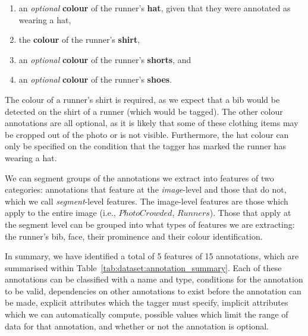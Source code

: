 \begin{enumerate}
  \item an \textit{optional} \textbf{colour} of the runner's \textbf{hat}, given that they were annotated as wearing a hat,
  \item the \textbf{colour} of the runner's \textbf{shirt},
  \item an \textit{optional} \textbf{colour} of the runner's \textbf{shorts}, and
  \item an \textit{optional} \textbf{colour} of the runner's \textbf{shoes}.
\end{enumerate}


The colour of a runner's shirt is required, as we expect that a bib would be detected on the shirt of a runner (which would be tagged). The other colour annotations are all optional, as it is likely that some of these clothing items may be cropped out of the photo or is not visible. Furthermore, the hat colour can only be specified on the condition that the tagger has marked the runner has wearing a hat.

We can segment groups of the annotations we extract into features of two categories: annotations that feature at the \textit{image}-level and those that do not, which we call \textit{segment}-level features. The image-level features are those which apply to the entire image (i.e., $PhotoCrowded$, $Runners$). Those that apply at the segment level can be grouped into what types of features we are extracting: the runner's bib, face, their prominence and their colour identification.

In summary, we have identified a total of 5 features of 15 annotations, which are summarised within Table~\ref{tab:dataset:annotation_summary}. Each of these annotations can be classified with a name and type, conditions for the annotation to be valid, dependencies on other annotations to exist before the annotation can be made, explicit attributes which the tagger must specify, implicit attributes which we can automatically compute, possible values which limit the range of data for that annotation, and whether or not the annotation is optional.



